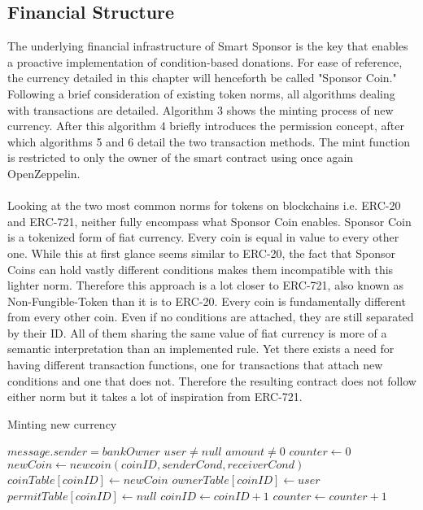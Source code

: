 \subsection{Financial Structure}
The underlying financial infrastructure of Smart Sponsor is the key that enables a proactive implementation of condition-based donations. For ease of reference, the currency detailed in this chapter will henceforth be called "Sponsor Coin." Following a brief consideration of existing token norms, all algorithms dealing with transactions are detailed. Algorithm 3 shows the minting process of new currency. After this algorithm 4 briefly introduces the permission concept, after which algorithms 5 and 6 detail the two transaction methods. The mint function is restricted to only the owner of the smart contract using once again OpenZeppelin\cite{Zeppelin}.\\
\\
Looking at the two most common norms for tokens on blockchains i.e. ERC-20 and ERC-721, neither fully encompass what Sponsor Coin enables. Sponsor Coin is a tokenized form of fiat currency. Every coin is equal in value to every other one. While this at first glance seems similar to ERC-20, the fact that Sponsor Coins can hold vastly different conditions makes them incompatible with this lighter norm. Therefore this approach is a lot closer to ERC-721, also known as Non-Fungible-Token than it is to ERC-20. Every coin is fundamentally different from every other coin. Even if no conditions are attached, they are still separated by their ID. All of them sharing the same value of fiat currency is more of a semantic interpretation than an implemented rule. Yet there exists a need for having different transaction functions, one for transactions that attach new conditions and one that does not. Therefore the resulting contract does not follow either norm but it takes a lot of inspiration from ERC-721.\\
\begin{algorithm}
\caption{Minting new currency}\label{alg:mint}
\begin{algorithmic}
\Require $message.sender = bankOwner$
\Require $user \neq null$
\Require $amount \neq 0$
\State $counter \gets 0$
\State $newCoin \gets new coin(coinID, senderCond, receiverCond)$
\State $coinTable[coinID] \gets newCoin$
\State $ownerTable[coinID] \gets user$
\State $permitTable[coinID] \gets null$
\State $coinID \gets coinID + 1$
\State $counter \gets counter + 1$
\EndWhile
\end{algorithmic}
\end{algorithm}
